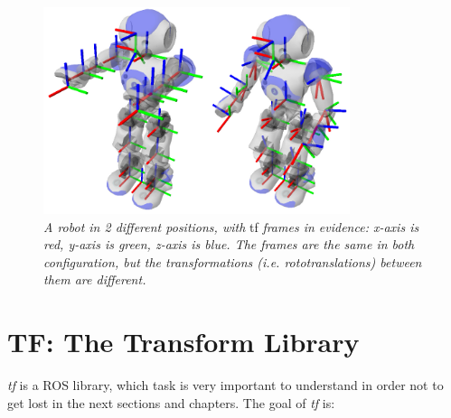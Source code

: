 \begin{figure}
	\centering
	\includegraphics[width=0.8\textwidth]{Images/background_and_tools/tf_tree.png}
	\caption{\textit{A robot in 2 different positions, with} tf \textit{frames in evidence: x-axis is red, y-axis is green, z-axis is blue. The frames are the same in both configuration, but the transformations (i.e. rototranslations) between them are different.}}
	\label{fig:tfTreeRviz}
\end{figure}


\section{TF: The Transform Library}\label{sec:tf}
\textit{tf} is a \ac{ROS} library, which task is very important to understand in order not to get lost in the next sections and chapters.  The goal of \textit{tf} is:

